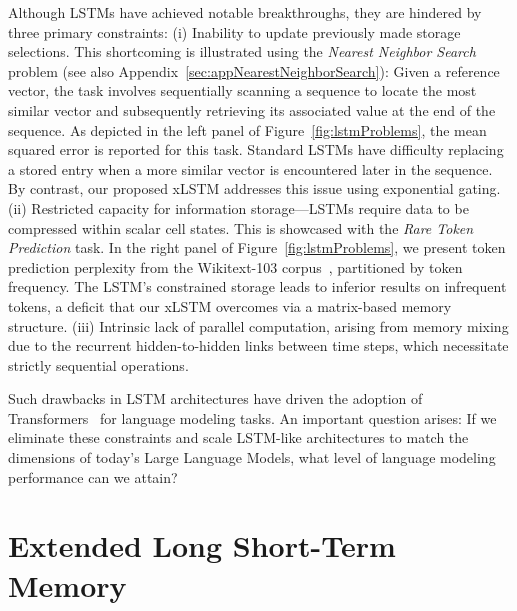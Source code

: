 Although LSTMs have achieved notable breakthroughs, they are hindered by three primary constraints: (i) Inability to update previously made storage selections. This shortcoming is illustrated using the {\it Nearest Neighbor Search} problem (see also Appendix~\ref{sec:appNearestNeighborSearch}): Given a reference vector, the task involves sequentially scanning a sequence to locate the most similar vector and subsequently retrieving its associated value at the end of the sequence. As depicted in the left panel of Figure~\ref{fig:lstmProblems}, the mean squared error is reported for this task. Standard LSTMs have difficulty replacing a stored entry when a more similar vector is encountered later in the sequence. By contrast, our proposed xLSTM addresses this issue using exponential gating. (ii) Restricted capacity for information storage—LSTMs require data to be compressed within scalar cell states. This is showcased with the {\it Rare Token Prediction} task. In the right panel of Figure~\ref{fig:lstmProblems}, we present token prediction perplexity from the Wikitext-103 corpus~\citep{Merity:17}, partitioned by token frequency. The LSTM’s constrained storage leads to inferior results on infrequent tokens, a deficit that our xLSTM overcomes via a matrix-based memory structure. (iii) Intrinsic lack of parallel computation, arising from memory mixing due to the recurrent hidden-to-hidden links between time steps, which necessitate strictly sequential operations.

Such drawbacks in LSTM architectures have driven the adoption of Transformers~\citep{Vaswani:17} for language modeling tasks. An important question arises: If we eliminate these constraints and scale LSTM-like architectures to match the dimensions of today’s Large Language Models, what level of language modeling performance can we attain?

\section{Extended Long Short-Term Memory}
\label{sec:xLSTM}

